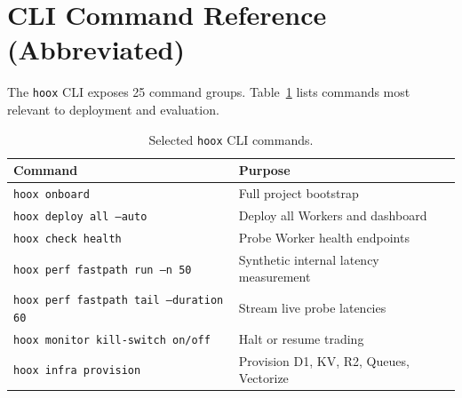 \section{CLI Command Reference (Abbreviated)}
\label{app:cli}

The \texttt{hoox} CLI exposes 25 command groups. Table~\ref{tab:cli} lists commands most relevant to deployment and evaluation.

\begin{table}[h]
  \centering
  \caption{Selected \texttt{hoox} CLI commands.}
  \label{tab:cli}
  \small
  \begin{tabular*}{\linewidth}{@{\extracolsep{\fill}}ll@{}}
    \toprule
    \textbf{Command} & \textbf{Purpose} \\
    \midrule
    \texttt{hoox onboard} & Full project bootstrap \\
    \texttt{hoox deploy all --auto} & Deploy all Workers and dashboard \\
    \texttt{hoox check health} & Probe Worker health endpoints \\
    \texttt{hoox perf fastpath run --n 50} & Synthetic internal latency measurement \\
    \texttt{hoox perf fastpath tail --duration 60} & Stream live probe latencies \\
    \texttt{hoox monitor kill-switch on/off} & Halt or resume trading \\
    \texttt{hoox infra provision} & Provision D1, KV, R2, Queues, Vectorize \\
    \bottomrule
  \end{tabular*}
\end{table}